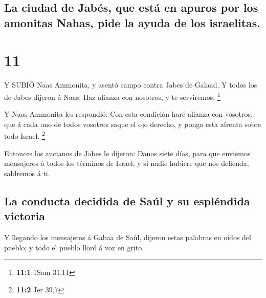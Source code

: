 \hypertarget{la-ciudad-de-jabuxe9s-que-estuxe1-en-apuros-por-los-amonitas-nahas-pide-la-ayuda-de-los-israelitas.}{%
\subsection{La ciudad de Jabés, que está en apuros por los amonitas
Nahas, pide la ayuda de los
israelitas.}\label{la-ciudad-de-jabuxe9s-que-estuxe1-en-apuros-por-los-amonitas-nahas-pide-la-ayuda-de-los-israelitas.}}

\hypertarget{section-10}{%
\section{11}\label{section-10}}

 Y SUBIÓ Naas Ammonita, y asentó campo contra Jabes de
Galaad. Y todos los de Jabes dijeron á Naas: Haz alianza con nosotros, y
te serviremos. \footnote{\textbf{11:1} 1Sam 31,11}

 Y Naas Ammonita les respondió: Con esta condición haré
alianza con vosotros, que á cada uno de todos vosotros saque el ojo
derecho, y ponga esta afrenta sobre todo Israel. \footnote{\textbf{11:2}
  Jer 39,7}

 Entonces los ancianos de Jabes le dijeron: Danos siete
días, para que enviemos mensajeros á todos los términos de Israel; y si
nadie hubiere que nos defienda, saldremos á ti.

\hypertarget{la-conducta-decidida-de-sauxfal-y-su-espluxe9ndida-victoria}{%
\subsection{La conducta decidida de Saúl y su espléndida
victoria}\label{la-conducta-decidida-de-sauxfal-y-su-espluxe9ndida-victoria}}

 Y llegando los mensajeros á Gabaa de Saúl, dijeron estas
palabras en oídos del pueblo; y todo el pueblo lloró á voz en grito.

